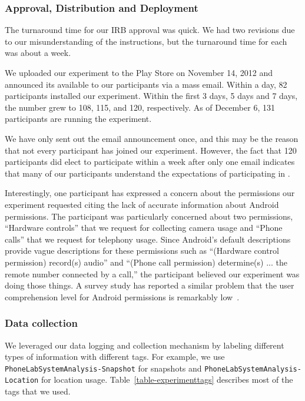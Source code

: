 \subsubsection{Approval, Distribution and Deployment}

The turnaround time for our IRB approval was quick. We had two revisions due
to our misunderstanding of the instructions, but the turnaround time for each
was about a week.

We uploaded our experiment to the Play Store on November 14, 2012 and
announced its available to our participants via a mass email. Within a day,
82 participants installed our experiment. Within the first 3 days, 5 days and
7 days, the number grew to 108, 115, and 120, respectively. As of December 6,
131 participants are running the experiment.

We have only sent out the email announcement once, and this may be the reason
that not every participant has joined our experiment. However, the fact that
120 participants did elect to participate within a week after only one email
indicates that many of our participants understand the expectations of
participating in \PhoneLab{}.

Interestingly, one participant has expressed a concern about the permissions
our experiment requested citing the lack of accurate information about
Android permissions. The participant was particularly concerned about two
permissions, ``Hardware controls'' that we request for collecting camera
usage and ``Phone calls'' that we request for telephony usage. Since
Android's default descriptions provide vague descriptions for these
permissions such as ``(Hardware control permission) record(s) audio'' and
``(Phone call permission) determine(s) ... the remote number connected by a
call,'' the participant believed our experiment was doing those things. A
survey study has reported a similar problem that the user comprehension level
for Android permissions is remarkably low~\cite{felt:soups:2012}.

\subsubsection{Data collection}

We leveraged our data logging and collection mechanism by
labeling different types of information with different tags. For example,
we use \texttt{PhoneLabSystemAnalysis-Snapshot} for snapshots and
\texttt{PhoneLabSystemAnalysis-Location} for location usage.
Table~\ref{table-experimenttags} describes most of the tags that we used.
